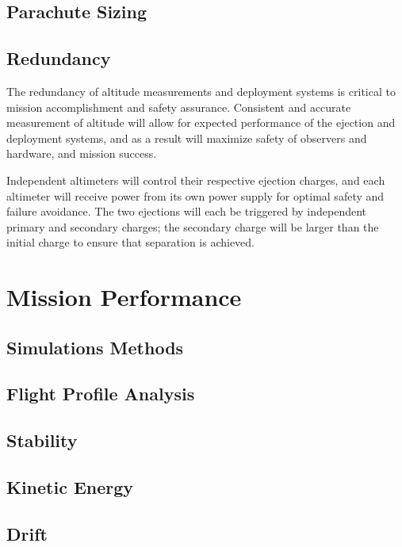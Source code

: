     \subsection{Parachute Sizing}
    
    \subsection{Redundancy}
The redundancy of altitude measurements and deployment systems is critical to mission accomplishment and safety assurance. Consistent and accurate measurement of altitude will allow for expected performance of the ejection and deployment systems, and as a result will maximize safety of observers and hardware, and mission success.

Independent altimeters will control their respective ejection charges, and each altimeter will receive power from its own power supply for optimal safety and failure avoidance. The two ejections will each be triggered by independent primary and secondary charges; the secondary charge will be larger than the initial charge to ensure that separation is achieved. 



\section{Mission Performance}

    \subsection{Simulations Methods}
    
    \subsection{Flight Profile Analysis}
    
    \subsection{Stability}
    
    \subsection{Kinetic Energy}
    
    \subsection{Drift}
    
